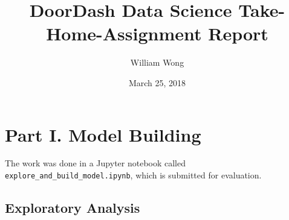 \documentclass[12pt]{article}
\begin{document}
\title{DoorDash Data Science Take-Home-Assignment Report}

\author{William Wong}
\date{March 25, 2018}

\maketitle









\section{Part I. Model Building}

The work was done in a Jupyter notebook called \texttt{explore\_and\_build\_model.ipynb},
which is submitted for evaluation.

\subsection{Exploratory Analysis}
\end{document}
